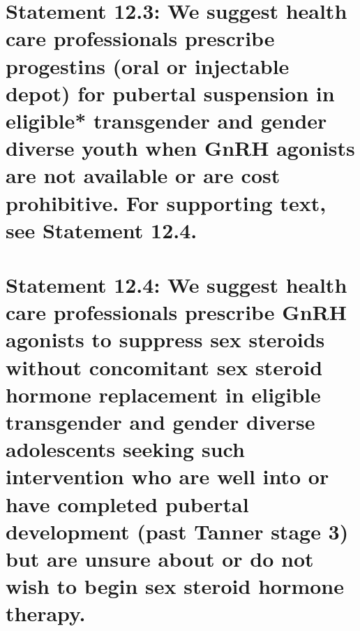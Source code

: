 \documentclass[
]{book}
\begin{document}
\hypertarget{statement-12.3-we-suggest-health-care-professionals-prescribe-progestins-oral-or-injectable-depot-for-pubertal-suspension-in-eligible-transgender-and-gender-diverse-youth-when-gnrh-agonists-are-not-available-or-are-cost-prohibitive.-for-supporting-text-see-statement-12.4.}{%
\section*{Statement 12.3: We suggest health care professionals prescribe progestins (oral or injectable depot) for pubertal suspension in eligible* transgender and gender diverse youth when GnRH agonists are not available or are cost prohibitive. For supporting text, see Statement 12.4.}\label{statement-12.3-we-suggest-health-care-professionals-prescribe-progestins-oral-or-injectable-depot-for-pubertal-suspension-in-eligible-transgender-and-gender-diverse-youth-when-gnrh-agonists-are-not-available-or-are-cost-prohibitive.-for-supporting-text-see-statement-12.4.}}

\hypertarget{statement-12.4-we-suggest-health-care-professionals-prescribe-gnrh-agonists-to-suppress-sex-steroids-without-concomitant-sex-steroid-hormone-replacement-in-eligible-transgender-and-gender-diverse-adolescents-seeking-such-intervention-who-are-well-into-or-have-completed-pubertal-development-past-tanner-stage-3-but-are-unsure-about-or-do-not-wish-to-begin-sex-steroid-hormone-therapy.}{%
\section*{Statement 12.4: We suggest health care professionals prescribe GnRH agonists to suppress sex steroids without concomitant sex steroid hormone replacement in eligible transgender and gender diverse adolescents seeking such intervention who are well into or have completed pubertal development (past Tanner stage 3) but are unsure about or do not wish to begin sex steroid hormone therapy.}\label{statement-12.4-we-suggest-health-care-professionals-prescribe-gnrh-agonists-to-suppress-sex-steroids-without-concomitant-sex-steroid-hormone-replacement-in-eligible-transgender-and-gender-diverse-adolescents-seeking-such-intervention-who-are-well-into-or-have-completed-pubertal-development-past-tanner-stage-3-but-are-unsure-about-or-do-not-wish-to-begin-sex-steroid-hormone-therapy.}}
\end{document}
